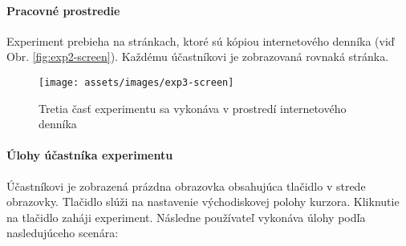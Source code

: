 \paragraph{Pracovné prostredie}
Experiment prebieha na stránkach, ktoré sú kópiou internetového denníka (viď Obr. \ref{fig:exp2-screen}). Každému účastníkovi je zobrazovaná rovnaká stránka.

\begin{figure}[h]
\centering
\texttt{[image: assets/images/exp3-screen]}
\caption{Tretia časť experimentu sa vykonáva v prostredí internetového denníka \label{fig:exp3-screen}}
\end{figure}

\paragraph{Úlohy účastníka experimentu}
Účastníkovi je zobrazená prázdna obrazovka obsahujúca tlačidlo v strede obrazovky. Tlačidlo slúži na nastavenie východiskovej polohy kurzora. Kliknutie na tlačidlo zaháji experiment. Následne používateľ vykonáva úlohy podľa nasledujúceho scenára:


